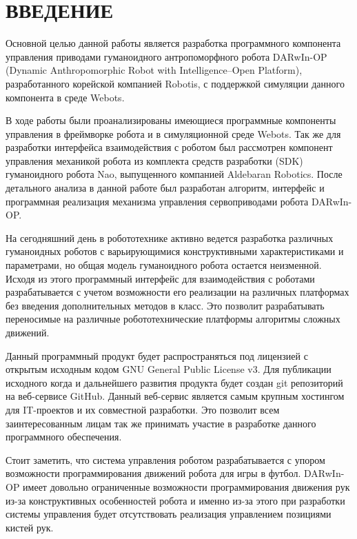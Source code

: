 \chapter*{ВВЕДЕНИЕ}

Основной целью данной работы является разработка программного компонента управления приводами гуманоидного антропоморфного робота DARwIn-OP (Dynamic Anthropomorphic Robot with Intelligence–Open Platform), разработанного корейской компанией  Robotis, с поддержкой симуляции данного компонента в среде Webots.

В ходе работы были проанализированы имеющиеся программные компоненты управления в фреймворке робота и в симуляционной среде Webots. Так же для разработки интерфейса взаимодействия с роботом был рассмотрен компонент управления механикой робота из комплекта средств разработки (SDK) гуманоидного робота Nao, выпущенного компанией Aldebaran Robotics. После детального анализа в данной работе был разработан алгоритм, интерфейс и программная реализация механизма управления сервоприводами робота DARwIn-OP.

На сегодняшний день в робототехнике активно ведется разработка различных гуманоидных роботов с варьирующимися конструктивными характеристиками и параметрами, но общая модель гуманоидного робота остается неизменной. Исходя из этого программный интерфейс для взаимодействия с роботами разрабатывается с учетом возможности его реализации на различных платформах без введения дополнительных методов в класс. Это позволит разрабатывать переносимые на различные робототехнические платформы алгоритмы сложных движений.

Данный программный продукт будет распространяться под лицензией с открытым исходным кодом GNU General Public License v3. Для публикации исходного когда и дальнейшего развития продукта будет создан git репозиторий на веб-сервисе GitHub. Данный веб-сервис является самым крупным хостингом для IT-проектов и их совместной разработки. Это позволит всем заинтересованным лицам так же принимать участие в разработке данного программного обеспечения.

Стоит заметить, что система управления роботом разрабатывается с упором возможности программирования движений робота для игры в футбол. DARwIn-OP имеет довольно ограниченные возможности программирования движения рук из-за конструктивных особенностей робота и именно из-за этого при разработки системы управления будет отсутствовать реализация управлением позициями кистей рук.